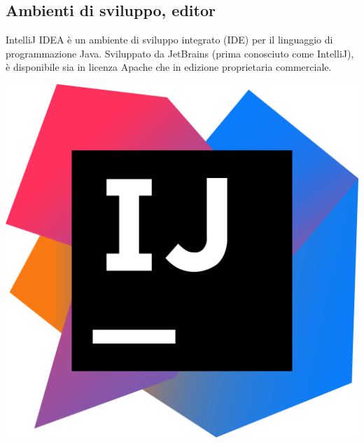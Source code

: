 \documentclass[twoside]{supsistudent}
\begin{document}
\subsection{Ambienti di sviluppo, editor}
\noindent
\begin{minipage}[H]{0.49\textwidth} 
  \begin{flushleft}
  IntelliJ IDEA è un ambiente di sviluppo integrato (IDE) per il linguaggio di programmazione Java. 
  Sviluppato da JetBrains (prima conosciuto come IntelliJ), è disponibile sia in licenza Apache che in 
  edizione proprietaria commerciale.
  \end{flushleft}
  \end{minipage}
\hfill
\begin{minipage}[H]{0.49\textwidth}
  \begin{center}
    \includegraphics[scale=0.1]{images/IdeaLogo.png}
  \end{center}
\end{minipage}
\end{document}
